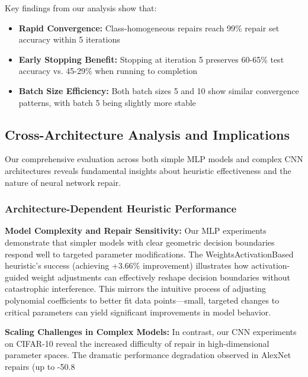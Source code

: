 \documentclass{article}
\begin{document}
\begin{description}
Key findings from our analysis show that:
\begin{itemize}
	\item \textbf{Rapid Convergence:} Class-homogeneous repairs reach 99\% repair set accuracy within 5 iterations
	\item \textbf{Early Stopping Benefit:} Stopping at iteration 5 preserves 60-65\% test accuracy vs. 45-29\% when running to completion
	\item \textbf{Batch Size Efficiency:} Both batch sizes 5 and 10 show similar convergence patterns, with batch 5 being slightly more stable
\end{itemize}

\subsection{Cross-Architecture Analysis and Implications}

Our comprehensive evaluation across both simple MLP models and complex CNN architectures reveals fundamental insights about heuristic effectiveness and the nature of neural network repair.

\subsubsection{Architecture-Dependent Heuristic Performance}

\textbf{Model Complexity and Repair Sensitivity:} Our MLP experiments demonstrate that simpler models with clear geometric decision boundaries respond well to targeted parameter modifications. The WeightsActivationBased heuristic's success (achieving +3.66\% improvement) illustrates how activation-guided weight adjustments can effectively reshape decision boundaries without catastrophic interference. This mirrors the intuitive process of adjusting polynomial coefficients to better fit data points—small, targeted changes to critical parameters can yield significant improvements in model behavior.

\textbf{Scaling Challenges in Complex Models:} In contrast, our CNN experiments on CIFAR-10 reveal the increased difficulty of repair in high-dimensional parameter spaces. The dramatic performance degradation observed in AlexNet repairs (up to -50.8%


\end{description}
\end{document}
